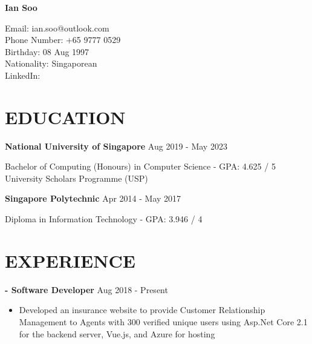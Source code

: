 \documentclass[11pt]{article} %
\begin{document}

{\LARGE\bfseries Ian Soo} %

Email: ian.soo@outlook.com\\
Phone Number: +65 9777 0529\\
Birthday: 08 Aug 1997\\
Nationality: Singaporean\\
LinkedIn: \href{https://www.linkedin.com/in/sooian/}{\color{black}{https://www.linkedin.com/in/sooian/}}


\section*{EDUCATION}

\textbf{National University of Singapore} \hfill Aug 2019 - May 2023

Bachelor of Computing (Honours) in Computer Science - GPA: 4.625 / 5\\
University Scholars Programme (USP)

\medskip

\textbf{Singapore Polytechnic} \hfill Apr 2014 - May 2017

Diploma in Information Technology - GPA: 3.946 / 4


\section*{EXPERIENCE}

\textbf{\href{https://policyxchange.com}{\color{black}{PolicyXchange.com}} - Software Developer} \hfill Aug 2018 - Present

\smallskip
\begin{itemize}

    \item Developed an insurance website to provide Customer Relationship Management to Agents with 300 verified unique users using Asp.Net Core 2.1 for the backend server, Vue.js, and Azure for hosting

\end{itemize}
\end{document}
